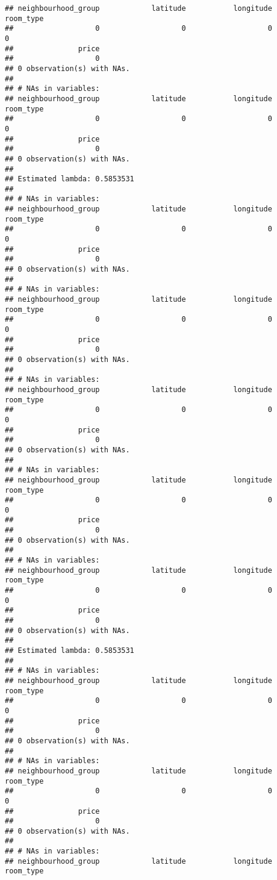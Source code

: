 \documentclass[
]{article}
\begin{document}
\begin{verbatim}
## neighbourhood_group            latitude           longitude           room_type 
##                   0                   0                   0                   0 
##               price 
##                   0 
## 0 observation(s) with NAs.
## 
## # NAs in variables:
## neighbourhood_group            latitude           longitude           room_type 
##                   0                   0                   0                   0 
##               price 
##                   0 
## 0 observation(s) with NAs.
## 
## Estimated lambda: 0.5853531 
## 
## # NAs in variables:
## neighbourhood_group            latitude           longitude           room_type 
##                   0                   0                   0                   0 
##               price 
##                   0 
## 0 observation(s) with NAs.
## 
## # NAs in variables:
## neighbourhood_group            latitude           longitude           room_type 
##                   0                   0                   0                   0 
##               price 
##                   0 
## 0 observation(s) with NAs.
## 
## # NAs in variables:
## neighbourhood_group            latitude           longitude           room_type 
##                   0                   0                   0                   0 
##               price 
##                   0 
## 0 observation(s) with NAs.
## 
## # NAs in variables:
## neighbourhood_group            latitude           longitude           room_type 
##                   0                   0                   0                   0 
##               price 
##                   0 
## 0 observation(s) with NAs.
## 
## # NAs in variables:
## neighbourhood_group            latitude           longitude           room_type 
##                   0                   0                   0                   0 
##               price 
##                   0 
## 0 observation(s) with NAs.
## 
## Estimated lambda: 0.5853531 
## 
## # NAs in variables:
## neighbourhood_group            latitude           longitude           room_type 
##                   0                   0                   0                   0 
##               price 
##                   0 
## 0 observation(s) with NAs.
## 
## # NAs in variables:
## neighbourhood_group            latitude           longitude           room_type 
##                   0                   0                   0                   0 
##               price 
##                   0 
## 0 observation(s) with NAs.
## 
## # NAs in variables:
## neighbourhood_group            latitude           longitude           room_type 

\end{verbatim}
\end{document}
